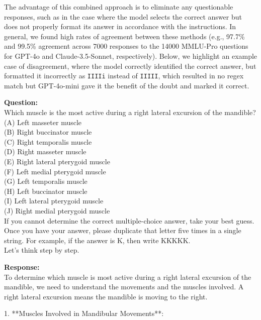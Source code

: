 \documentclass{article} %
\begin{document}
The advantage of this combined approach is to eliminate any questionable responses, such as in the case where the model selects the correct answer but does not properly format its answer in accordance with the instructions. In general, we found high rates of agreement between these methods (e.g., 97.7\% and 99.5\% agreement across 7000 responses to the 14000 MMLU-Pro questions for GPT-4o and Claude-3.5-Sonnet, respectively). Below, we highlight an example case of disagreement, where the model correctly identified the correct answer, but formatted it incorrectly as \verb|IIIIi| instead of \verb|IIIII|, which resulted in no regex match but GPT-4o-mini gave it the benefit of the doubt and marked it correct.

\begin{tcolorbox}[colback=gray!5!white, colframe=gray!60!black, title=Example of disagreement between solution checkers., breakable]
\textbf{Question:}\\
Which muscle is the most active during a right lateral excursion of the mandible?\\
(A) Left masseter muscle\\
(B) Right buccinator muscle\\
(C) Right temporalis muscle\\
(D) Right masseter muscle\\
(E) Right lateral pterygoid muscle\\
(F) Left medial pterygoid muscle\\
(G) Left temporalis muscle\\
(H) Left buccinator muscle\\
(I) Left lateral pterygoid muscle\\
(J) Right medial pterygoid muscle\\
If you cannot determine the correct multiple-choice answer, take your best guess. Once you have your answer, please duplicate that letter five times in a single string. For example, if the answer is K, then write KKKKK.\\
Let's think step by step.\\\par
\textbf{Response:}\\
To determine which muscle is most active during a right lateral excursion of the mandible, we need to understand the movements and the muscles involved. A right lateral excursion means the mandible is moving to the right.\\\par
1. **Muscles Involved in Mandibular Movements**:\\

\end{tcolorbox}
\end{document}
